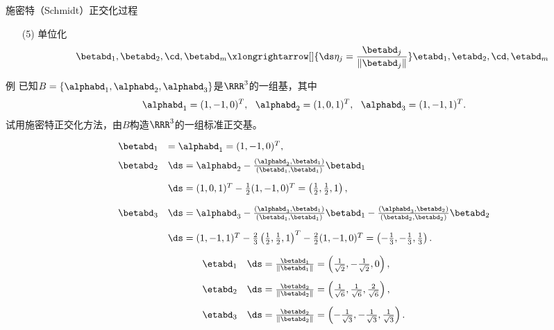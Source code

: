 \begin{frame}
  \begin{footnotesize}
    \begin{block}{施密特（Schmidt）正交化过程}
      \begin{itemize}
      \item[(5)] 单位化
        $$
        \betabd_1, \betabd_2, \cd, \betabd_m \xlongrightarrow[]{\ds \eta_j=\frac{\betabd_j}{\|\betabd_j\|}}
        \etabd_1, \etabd_2, \cd, \etabd_m
        $$
      \end{itemize}
    \end{block}
  \end{footnotesize}
\end{frame}


\begin{frame}
  \begin{footnotesize}
    \begin{exampleblock}{例}
      已知$B=\{\alphabd_1,\alphabd_2,\alphabd_3\}$是$\RRR^3$的一组基，其中
      $$
      \alphabd_1=(1,-1,0)^T,~~
      \alphabd_2=(1,0,1)^T,~~
      \alphabd_3=(1,-1,1)^T.
      $$
      试用施密特正交化方法，由$B$构造$\RRR^3$的一组标准正交基。
    \end{exampleblock}
    \pause\jiename
    $$
    \begin{array}{rl}
      \betabd_1&=\alphabd_1=(1,-1,0)^T, \\[0.2cm]
      \betabd_2&\ds=\alphabd_2-\frac{(\alphabd_2,\betabd_1)}{(\betabd_1,\betabd_1)}\betabd_1\\[0.4cm]
      &\ds=(1,0,1)^T-\frac12(1,-1,0)^T=\left(\frac12,\frac12,1\right),\\[0.4cm]
      \betabd_3&\ds=\alphabd_3-\frac{(\alphabd_3,\betabd_1)}{(\betabd_1,\betabd_1)}\betabd_1
      -\frac{(\alphabd_3,\betabd_2)}{(\betabd_2,\betabd_2)}\betabd_2\\[0.4cm]
      &\ds=(1,-1,1)^T-\frac23\left(\frac12,\frac12,1\right)^T-\frac22(1,-1,0)^T
      =\left(-\frac13,-\frac13,\frac13\right).
    \end{array}
    $$
  \end{footnotesize}
\end{frame}


\begin{frame}
  \begin{footnotesize}
    $$
    \begin{array}{rl}
      \etabd_1&\ds =\frac{\betabd_1}{\|\betabd_1\|}=\left(\frac1{\sqrt{2}},-\frac1{\sqrt{2}},0\right),\\[0.4cm]
      \etabd_2&\ds =\frac{\betabd_2}{\|\betabd_2\|}=\left(\frac1{\sqrt{6}},\frac1{\sqrt{6}},\frac2{\sqrt{6}}\right),\\[0.4cm]
      \etabd_3&\ds =\frac{\betabd_2}{\|\betabd_2\|}=\left(-\frac1{\sqrt{3}},-\frac1{\sqrt{3}},\frac1{\sqrt{3}}\right).
    \end{array}
    $$
  \end{footnotesize}
\end{frame}
